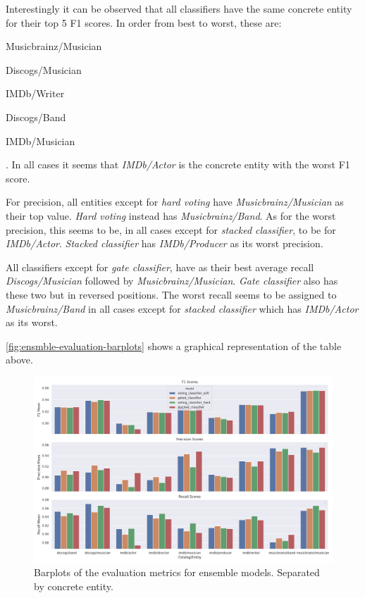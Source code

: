\documentclass[epsfig,a4paper,11pt,titlepage,twoside,openany]{book}
\begin{document}
Interestingly it can be observed that all classifiers have the same concrete entity for their top 5 F1 scores. In order from best to worst, these are: 
\begin{itemize*}
    \item Musicbrainz/Musician
    \item Discogs/Musician
    \item IMDb/Writer
    \item Discogs/Band
    \item IMDb/Musician
\end{itemize*}. In all cases it seems that \textit{IMDb/Actor} is the concrete entity with the worst F1 score.

For precision, all entities except for \textit{hard voting} have \textit{Musicbrainz/Musician} as their top value. \textit{Hard voting} instead has \textit{Musicbrainz/Band}. As for the worst precision, this seems to be, in all cases except for \textit{stacked classifier}, to be for \textit{IMDb/Actor}. \textit{Stacked classifier} has \textit{IMDb/Producer} as its worst precision.

All classifiers except for \textit{gate classifier}, have as their best average recall \textit{Discogs/Musician} followed by \textit{Musicbrainz/Musician}. \textit{Gate classifier} also has these two but in reversed positions. The worst recall seems to be assigned to \textit{Musicbrainz/Band} in all cases except for \textit{stacked classifier} which has \textit{IMDb/Actor} as its worst. 

\autoref{fig:ensmble-evaluation-barplots} shows a graphical representation of the table above.

\begin{figure}[H]
  \centering \includegraphics[width=\textwidth]{ensemble_evluation_main_metrics_barplot} 
  \caption{Barplots of the evaluation metrics for ensemble models. Separated by concrete entity.}
  \label{fig:ensmble-evaluation-barplots}
\end{figure}
\end{document}

